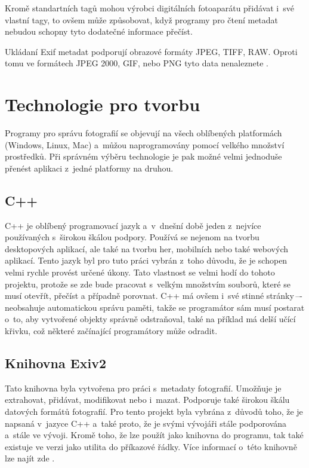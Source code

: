 Kromě standartních tagů mohou výrobci digitálních fotoaparátu přidávat i~své vlastní tagy, to ovšem může způsobovat, když programy pro čtení metadat nebudou schopny tyto dodatečné informace přečíst.

Ukládaní Exif metadat podporují obrazové formáty JPEG, TIFF, RAW. Oproti tomu ve formátech JPEG 2000, GIF, nebo PNG tyto data nenaleznete \cite{datove_formaty_web}.

\section{Technologie pro tvorbu}

Programy pro správu fotografií se objevují na všech oblíbených platformách (Windows, Linux, Mac) a~můžou naprogramovány pomocí velkého množství prostředků. Při správném výběru technologie je pak možné velmi jednoduše přenést aplikaci z~jedné platformy na druhou.

\subsection*{C++}

C++ je oblíbený programovací jazyk a~v~dnešní době jeden z~nejvíce používaných s~širokou škálou podpory. Používá se nejenom na tvorbu desktopových aplikací, ale také na tvorbu her, mobilních nebo také webových aplikací. Tento jazyk byl pro tuto práci vybrán z~toho důvodu, že je schopen velmi rychle provést určené úkony. Tato vlastnost se velmi hodí do tohoto projektu, protože se zde bude pracovat s~velkým množstvím souborů, které se musí otevřít, přečíst a případně porovnat. C++ má ovšem i~své stinné stránky\,–-\,neobsahuje automatickou správu paměti, takže se programátor sám musí postarat o~to, aby vytvořené objekty správně odstraňoval, také na příklad má delší učící křivku, což některé začínající programátory může odradit.

\subsection*{Knihovna Exiv2}

Tato knihovna byla vytvořena pro práci s~metadaty fotografií. Umožňuje je extrahovat, přidávat, modifikovat nebo i~mazat. Podporuje také širokou škálu datových formátů fotografií. Pro tento projekt byla vybrána z~důvodů toho, že je napsaná v~jazyce C++ a~také proto, že je svými vývojáři stále podporována a~stále ve vývoji. Kromě toho, že lze použít jako knihovna do programu, tak také existuje ve verzi jako utilita do příkazové řádky. Více informací o~této knihovně lze najít zde \cite{EXIV_knihovna}.

